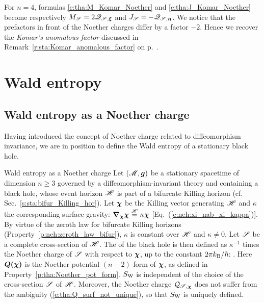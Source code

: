 \begin{remark}
For $n=4$, formulas \eqref{e:tha:M_Komar_Noether} and \eqref{e:tha:J_Komar_Noether}
become respectively $M_{\mathscr{S}} = 2 \mathscr{Q}_{\mathscr{S},\bm{\xi}}$ and $J_{\mathscr{S}} = - \mathscr{Q}_{\mathscr{S},\bm{\eta}}$. We notice that the prefactors in front of the Noether charges differ by a factor $-2$. Hence we recover the
\emph{Komar's anomalous factor} discussed in Remark~\ref{r:sta:Komar_anomalous_factor} on p.~\pageref{r:sta:Komar_anomalous_factor}.
\end{remark}



\section{Wald entropy}

\subsection{Wald entropy as a Noether charge}

Having introduced the concept of Noether charge related to diffeomorphism invariance,
we are in position to define the Wald entropy of a stationary black hole.

\begin{tprop}{Wald entropy as a Noether charge}{}
Let $(\mathscr{M},\bm{g})$ be a stationary spacetime of dimension $n\geq 3$ governed
by a diffeomorphism-invariant theory and containing a black hole, whose
event horizon $\mathscr{H}$ is part of a bifurcate Killing horizon (cf. Sec.~\ref{s:sta:bifur_Killing_hor}).
Let $\bm{\chi}$ be the Killing
vector generating $\mathscr{H}$ and $\kappa$ the corresponding surface gravity:
$\bm{\nabla}_{\bm{\chi}}\bm{\chi} \stackrel{\mathscr{H}}{=} \kappa \bm{\chi}$ [Eq.~(\ref{e:neh:xi_nab_xi_kappa})].
By virtue of the zeroth law for bifurcate Killing horizons (Property~\ref{p:neh:zeroth_law_bifur}),
$\kappa$ is constant over $\mathscr{H}$ and $\kappa \neq 0$.
Let $\mathscr{S}$ be a complete cross-section of $\mathscr{H}$.
The  of the black hole is
then defined as $\kappa^{-1}$ times
the Noether charge of $\mathscr{S}$ with respect to $\bm{\chi}$,
up to the constant $2\pi k_{\rm B}/\hbar$:
\be \label{e:tha:def_Wald_entropy}
     .
\ee
Here $\bm{Q}\textbf{(}\bm{\chi}\textbf{)}$ is the Noether potential $(n-2)$-form of $\bm{\chi}$,
as defined in Property~\ref{p:tha:Noether_pot_form}.
$S_{\rm W}$ is independent of the choice of the cross-section $\mathscr{S}$ of $\mathscr{H}$.
Moreover, the Noether charge $\mathcal{Q}_{\mathscr{S},\bm{\chi}}$ does not suffer from
the ambiguity (\ref{e:tha:Q_surf_not_unique}), so that $S_{\rm W}$ is uniquely defined.
\end{tprop}

